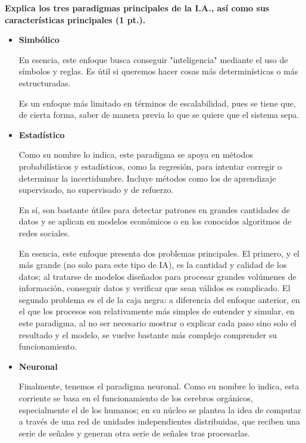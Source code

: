 \textbf{Explica los tres paradigmas principales de la I.A., así como sus características principales (1 pt.).}

\begin{itemize}
    \item \textbf{Simbólico}
    
    En esencia, este enfoque busca conseguir "inteligencia" mediante el uso de símbolos y reglas. Es útil si queremos hacer cosas más determinísticas o más estructuradas. \vspace{.3cm}

    Es un enfoque más limitado en términos de escalabilidad, pues se tiene que, de cierta forma, saber de manera previa lo que se quiere que el sistema sepa. \vspace{.3cm}
    
    \cite{russell2020artificial}

    \item \textbf{Estadístico}
    
    Como su nombre lo indica, este paradigma se apoya en métodos probabilísticos y estadísticos, como la regresión, para intentar corregir o determinar la incertidumbre. Incluye métodos como los de aprendizaje supervisado, no supervisado y de refuerzo. \vspace{.3cm}

    En sí, son bastante útiles para detectar patrones en grandes cantidades de datos y se aplican en modelos económicos o en los conocidos algoritmos de redes sociales. \vspace{.3cm}

    En esencia, este enfoque presenta dos problemas principales. El primero, y el más grande (no solo para este tipo de IA), es la cantidad y calidad de los datos; al tratarse de modelos diseñados para procesar grandes volúmenes de información, conseguir datos y verificar que sean válidos es complicado. El segundo problema es el de la caja negra: a diferencia del enfoque anterior, en el que los procesos son relativamente más simples de entender y simular, en este paradigma, al no ser necesario mostrar o explicar cada paso sino solo el resultado y el modelo, se vuelve bastante más complejo comprender su funcionamiento. \vspace{.3cm}

    \cite{bishop2006pattern}

    \item \textbf{Neuronal}
    
    Finalmente, tenemos el paradigma neuronal. Como su nombre lo indica, esta corriente se basa en el funcionamiento de los cerebros orgánicos, especialmente el de los humanos; en su núcleo se plantea la idea de computar a través de una red de unidades independientes distribuidas, que reciben una serie de señales y generan otra serie de señales tras procesarlas. \vspace{.3cm}


\end{itemize}
